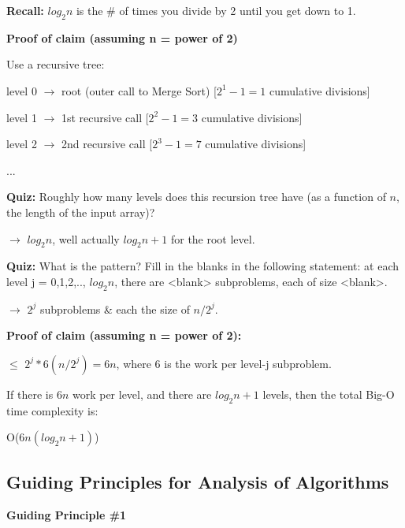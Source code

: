 \documentclass[11pt]{article}
\newenvironment{aside}
  {\begin{mdframed}[style=0,%
      leftline=false,rightline=false,leftmargin=2em,rightmargin=2em,%
          innerleftmargin=0pt,innerrightmargin=0pt,linewidth=0.75pt,%
      skipabove=7pt,skipbelow=7pt]\small}
  {\end{mdframed}}
\begin{document}
\vspace{11pt}
\begin{aside}
    \textbf{Recall:} \(log_2n\) is the \# of times you divide by 2 until you get down to 1.
\end{aside}
\vspace{11pt}

\textbf{Proof of claim (assuming n = power of 2)}

Use a recursive tree:

level 0 $\to$ root (outer call to Merge Sort) [\(2^1 - 1 = 1\) cumulative divisions]

level 1 $\to$ 1st recursive call [\(2^2 - 1 = 3\) cumulative divisions]

level 2 $\to$ 2nd recursive call [\(2^3 - 1 = 7\) cumulative divisions]

...

\vspace{11pt}
\begin{aside}
   \textbf{Quiz:} Roughly how many levels does this recursion tree have (as a function of $n$, the length of the input array)?

   $\to$ \(log_2n\), well actually \(log_2n + 1\) for the root level.
\end{aside}
\vspace{11pt}

\vspace{11pt}
\begin{aside}
   \textbf{Quiz:} What is the pattern? Fill in the blanks in the following statement: at each level j = 0,1,2,.., \(log_2n\), there are <blank> subproblems, each of size <blank>.

   $\to$ \(2^j\) subproblems \& each the size of \(n / 2^j\).

   \textbf{Proof of claim (assuming n = power of 2):} 
   
   $\leq$ \(2^j * 6(n/2^j) = 6n\), where $6$ is the work per level-j subproblem.

   If there is $6n$ work per level, and there are \(log_2n + 1\) levels, then the total Big-O time complexity is:

   O(\(6n(log_2n + 1)\))
\end{aside}
\vspace{11pt}

\subsection{Guiding Principles for Analysis of Algorithms}
\vspace{11pt}
\textbf{Guiding Principle \#1}
\vspace{11pt}
\end{document}
